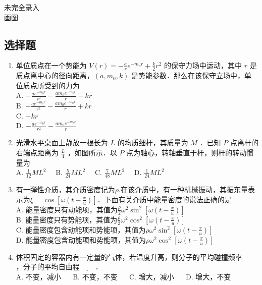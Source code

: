 
\begin{issues}
\issueTODO
未完全录入
\\ 画图

\end{issues}



\subsection{选择题}
\begin{enumerate}
\item 单位质点在一个势能为 $V(r) = -\frac{a}{r}e^{-m_{o}r}+\frac{k}{2}r^{2}$ 的保守力场中运动，其中 $r$ 是质点离中心的径向距离，$(a,m_{0},k)$ 是势能参数．那么在该保守立场中，单位质点所受到的力为\\
A. $-\frac{ae^{-m_{0}r}}{r^{2}}-\frac{am_{0}e^{-m_{0}r}}{r}-kr$\\
B. $-\frac{ae^{-m_{0}r}}{r^{2}}-\frac{am_{0}e^{-m_{0}r}}{r}+kr$\\
C. $-kr$\\
D. $-\frac{ae^{-m_{0}r}}{r^{2}}-\frac{am_{0}e^{-m_{0}r}}{r}$\\

\item 光滑水平桌面上静放一根长为 $L$ 的均质细杆，其质量为 $M$ ．已知 $P$ 点离杆的右端点距离为 $\frac{L}{4}$ ，如图所示．以 $P$ 点为轴心，转轴垂直于杆，则杆的转动惯量为\\
A. $\frac{1}{12}ML^{2} \quad$
B. $\frac{5}{24}ML^{2} \quad$
C. $\frac{7}{48}ML^{2} \quad$
D. $\frac{1}{24}ML^{2} \quad$

\item 有一弹性介质，其介质密度记为$\rho$.在该介质中，有一种机械振动，其振东量表示为$\xi = \cos{[\omega(t-\frac{x}{u})]}$．下面有关介质中能量密度的说法正确的是\\
A. 能量密度只有动能项，其值为$\frac{\rho}{2}\omega^{2}\sin^{2}{[\omega(t-\frac{x}{u})]}$\\
B. 能量密度只有势能项，其值为$\frac{\rho}{2}\omega^{2}\cos^{2}{[\omega(t-\frac{x}{u})]}$\\
C. 能量密度包含动能项和势能项，其值为$\rho\omega^{2}\sin^{2}{[\omega(t-\frac{x}{u})]}$\\
D. 能量密度包含动能项和势能项，其值为$\rho\omega^{2}\cos^{2}{[\omega(t-\frac{x}{u})]}$\\

\item 体积固定的容器内有一定量的气体，若温度升高，则分子的平均碰撞频率$\underline{~~~~~~~~~~}$，分子的平均自由程$\underline{~~~~~~~~~~}$．\\
A. 不变，减小 $\quad$
B. 不变，不变 $\quad$
C. 增大，减小 $\quad$
D. 增大，不变 $\quad$


\end{enumerate}
